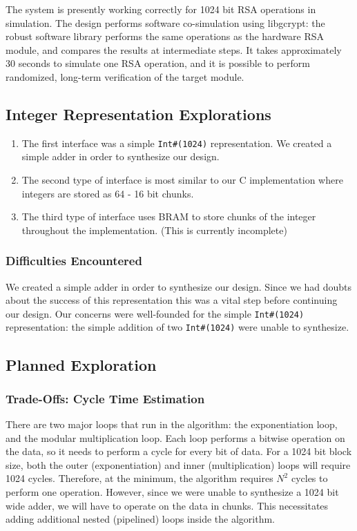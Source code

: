 \documentclass[12pt]{article}
\begin{document}
The system is presently working correctly for 1024 bit RSA operations in simulation. The design performs software co-simulation using libgcrypt: the robust software library
 performs the same operations as the hardware RSA module, and compares the results at intermediate steps. It takes approximately 30 seconds to simulate one RSA operation, and
it is possible to perform randomized, long-term verification of the target module. 

\subsection{Integer Representation Explorations}
\begin{enumerate}
\item The first interface was a simple {\tt Int\#(1024)} representation. We created a simple adder in order to synthesize our design.
\item The second type of interface is most similar to our C implementation where integers are stored as 64 - 16 bit chunks.
\item The third type of interface uses BRAM to store chunks of the integer throughout the implementation. (This is currently incomplete)
\end{enumerate}
\subsubsection{Difficulties Encountered}
We created a simple adder in order to synthesize our design.  Since we had doubts about the success of this representation this was a vital step before continuing our design. Our concerns were well-founded for the simple {\tt Int\#(1024)} representation: the simple addition of two {\tt Int\#(1024)} were unable to synthesize.
\subsection{Planned Exploration}

\subsubsection{Trade-Offs: Cycle Time Estimation}

There are two major loops that run in the algorithm: the exponentiation loop,
and the modular multiplication loop. Each loop performs a bitwise operation
on the data, so it needs to perform a cycle for every bit of data. For a
1024 bit block size, both the outer (exponentiation) and inner (multiplication)
loops will require 1024 cycles. Therefore, at the minimum, the algorithm
requires ${N}^2$ cycles to perform one operation. However, since we were unable
to synthesize a 1024 bit wide adder, we will have to operate on the data
in chunks. This necessitates adding additional nested (pipelined) loops
inside the algorithm.
\end{document}
